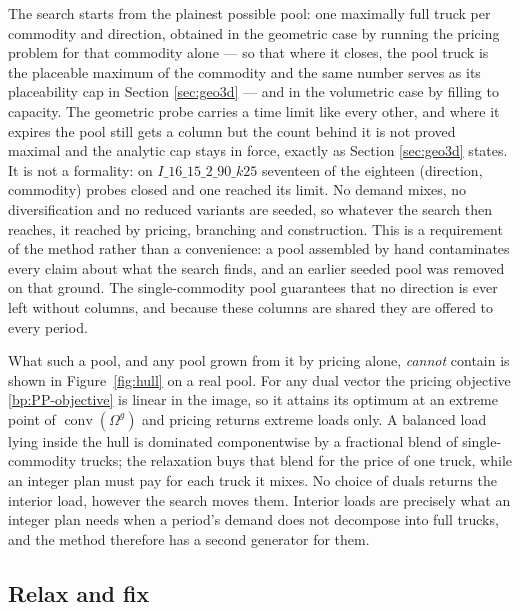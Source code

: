 The search starts from the plainest possible pool: one maximally full
truck per commodity and direction, obtained in the geometric case by
running the pricing problem for that commodity alone --- so that where
it closes, the pool truck is the placeable maximum of the commodity and
the same number serves as its placeability cap in Section
\ref{sec:geo3d} --- and in the volumetric case by filling to capacity.
The geometric probe carries a time limit like every other, and where it
expires the pool still gets a column but the count behind it is not
proved maximal and the analytic cap stays in force, exactly as Section
\ref{sec:geo3d} states. It is not a formality: on
$I\_16\_15\_2\_90\_k25$ seventeen of the eighteen (direction,
commodity) probes closed and one reached its limit. No demand mixes, no
diversification and no reduced variants are seeded, so whatever the
search then reaches, it reached by pricing, branching and construction.
This is a requirement of the method rather than a convenience: a pool
assembled by hand contaminates every claim about what the search finds,
and an earlier seeded pool was removed on that ground. The
single-commodity pool guarantees that no direction is ever left without
columns, and because these columns are shared they are offered to every
period.

What such a pool, and any pool grown from it by pricing alone,
\emph{cannot} contain is shown in Figure~\ref{fig:hull} on a real pool.
For any dual vector the pricing objective \eqref{bp:PP-objective} is
linear in the image, so it attains its optimum at an extreme point of
$\operatorname{conv}(\Omega^{g})$ and pricing returns extreme loads
only. A balanced load lying inside the hull is dominated componentwise
by a fractional blend of single-commodity trucks; the relaxation buys
that blend for the price of one truck, while an integer plan must pay
for each truck it mixes. No choice of duals returns the interior load,
however the search moves them. Interior loads are precisely what an
integer plan needs when a period's demand does not decompose into full
trucks, and the method therefore has a second generator for them.



\subsection{Relax and fix}
\label{sec:relaxfix}

